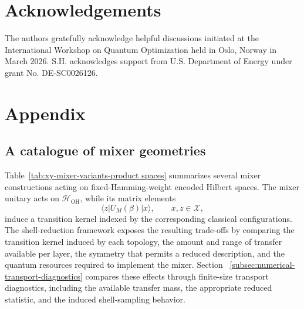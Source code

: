 \documentclass[a4paper,onecolumn,11pt,unpublished]{quantumarticle}
\theoremstyle{remark}
\begin{document}
\section*{Acknowledgements}
The authors gratefully acknowledge helpful discussions initiated at the International Workshop on Quantum Optimization held in Oslo, Norway in March 2026. S.H. acknowledges support from U.S. Department of Energy under grant No. DE-SC0026126.

\appendix
\appendix


\section{Appendix}

\subsection{A catalogue of mixer geometries}
\label{app:xy-mixer-catalogue}
Table~\ref{tab:xy-mixer-variants-product spaces} summarizes several mixer constructions acting on fixed-Hamming-weight encoded Hilbert spaces. The mixer unitary acts on \(\mathcal H_{\mathrm{OH}}\), while its matrix elements \[ \langle z|U_M(\beta)|x\rangle, \qquad x,z\in \mathcal X, \] induce a transition kernel indexed by the corresponding classical configurations. The shell-reduction framework exposes the resulting trade-offs by comparing the transition kernel induced by each topology, the amount and range of transfer available per layer, the symmetry that permits a reduced description, and the quantum resources required to implement the mixer. Section ~\ref{subsec:numerical-transport-diagnostics} compares these effects through finite-size transport diagnostics, including the available transfer mass, the appropriate reduced statistic, and the induced shell-sampling behavior. %




\end{document}

